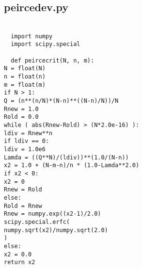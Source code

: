 \subsection{peirce\textunderscore dev.py}
\label{app:peircepy}
\texttt{ \\
~~import numpy\\
~~import scipy.special\\
~~\\
~~def peirce\textunderscore crit(N, n, m):\\
 \indent N = float(N)\\
 \indent n = float(n)\\
 \indent m = float(m)\\
 \indent if N > 1:\\
 \indent \indent Q = (n**(n/N)*(N-n)**((N-n)/N))/N\\
 \indent \indent Rnew = 1.0\\
 \indent \indent Rold = 0.0\\
 \indent \indent while ( abs(Rnew-Rold) > (N*2.0e-16) ):\\
 \indent \indent \indent ldiv = Rnew**n\\
 \indent \indent \indent if ldiv == 0:\\
 \indent \indent \indent \indent ldiv = 1.0e6\\
 \indent \indent \indent Lamda = ((Q**N)/(ldiv))**(1.0/(N-n))\\
 \indent \indent \indent x2 = 1.0 + (N-m-n)/n * (1.0-Lamda**2.0)\\
 \indent \indent \indent if x2 < 0:\\
 \indent \indent \indent \indent x2 = 0\\
 \indent \indent \indent \indent Rnew = Rold\\
 \indent \indent \indent else:\\
 \indent \indent \indent \indent Rold = Rnew\\
 \indent \indent \indent \indent Rnew = numpy.exp((x2-1)/2.0) \\ 
 \indent \indent \indent \indent \indent * scipy.special.erfc( \\   \indent \indent \indent \indent \indent \indent numpy.sqrt(x2)/numpy.sqrt(2.0)\\
 \indent \indent \indent \indent \indent )\\
 \indent else:\\
 \indent \indent x2 = 0.0\\
 \indent return x2\\
}

